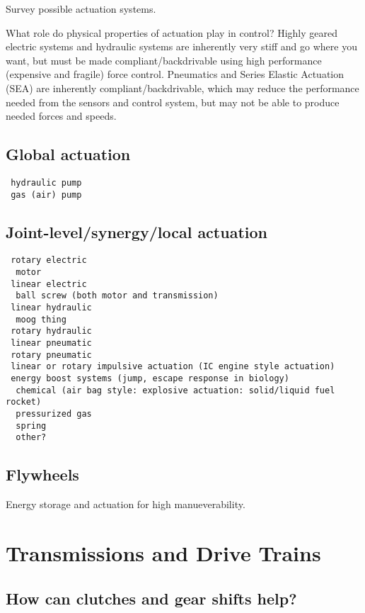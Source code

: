 \documentclass[letterpaper,12pt,fullpage]{article}
\begin{document}
Survey possible actuation systems.

What role do physical properties of actuation play in control? Highly
geared electric systems and hydraulic systems are inherently very
stiff and go where you want, but must be made compliant/backdrivable
using high performance (expensive and fragile) force control.
Pneumatics and Series Elastic Actuation (SEA) are inherently
compliant/backdrivable, which may reduce the performance
needed from the sensors and control system, but may not be able to
produce needed forces and speeds.

\subsection{Global actuation}

\begin{verbatim}
 hydraulic pump 
 gas (air) pump
\end{verbatim}

\subsection{Joint-level/synergy/local actuation}

\begin{verbatim}
 rotary electric
  motor
 linear electric
  ball screw (both motor and transmission)
 linear hydraulic
  moog thing
 rotary hydraulic
 linear pneumatic
 rotary pneumatic
 linear or rotary impulsive actuation (IC engine style actuation)
 energy boost systems (jump, escape response in biology)
  chemical (air bag style: explosive actuation: solid/liquid fuel rocket)
  pressurized gas
  spring
  other?
\end{verbatim}

\subsection{Flywheels}

Energy storage and actuation for high manueverability.

\section{Transmissions and Drive Trains}

\subsection{How can clutches and gear shifts help?}
\end{document}

